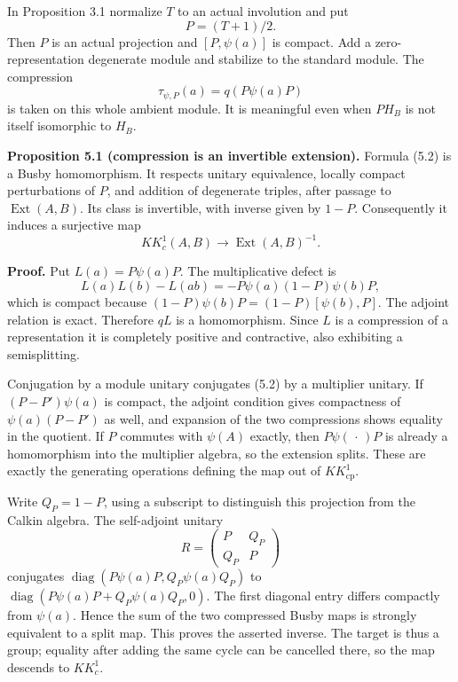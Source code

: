 \documentclass[
  11pt,
]{article}
\begin{document}
In Proposition 3.1 normalize \(T\) to an actual involution and put \[
P=(T+1)/2.
\tag{5.1}
\] Then \(P\) is an actual projection and \([P,\psi(a)]\) is compact.
Add a zero-representation degenerate module and stabilize to the
standard module. The compression \[
\tau_{\psi,P}(a)=q(P\psi(a)P)
\tag{5.2}
\] is taken on this whole ambient module. It is meaningful even when
\(PH_B\) is not itself isomorphic to \(H_B\).

\textbf{Proposition 5.1 (compression is an invertible extension).}
Formula (5.2) is a Busby homomorphism. It respects unitary equivalence,
locally compact perturbations of \(P\), and addition of degenerate
triples, after passage to \(\operatorname{Ext}(A,B)\). Its class is
invertible, with inverse given by \(1-P\). Consequently it induces a
surjective map \[
KK_c^1(A,B)\longrightarrow\operatorname{Ext}(A,B)^{-1}.
\tag{5.3}
\]

\textbf{Proof.} Put \(L(a)=P\psi(a)P\). The multiplicative defect is \[
L(a)L(b)-L(ab)
=-P\psi(a)(1-P)\psi(b)P,
\tag{5.4}
\] which is compact because \((1-P)\psi(b)P=(1-P)[\psi(b),P]\). The
adjoint relation is exact. Therefore \(qL\) is a homomorphism. Since
\(L\) is a compression of a representation it is completely positive and
contractive, also exhibiting a semisplitting.

Conjugation by a module unitary conjugates (5.2) by a multiplier
unitary. If \((P-P')\psi(a)\) is compact, the adjoint condition gives
compactness of \(\psi(a)(P-P')\) as well, and expansion of the two
compressions shows equality in the quotient. If \(P\) commutes with
\(\psi(A)\) exactly, then \(P\psi(\,\cdot\,)P\) is already a
homomorphism into the multiplier algebra, so the extension splits. These
are exactly the generating operations defining the map out of
\(KK_{\mathrm{cp}}^1\).

Write \(Q_P=1-P\), using a subscript to distinguish this projection from
the Calkin algebra. The self-adjoint unitary \[
R=\begin{pmatrix}P&Q_P\\Q_P&P\end{pmatrix}
\tag{5.5}
\] conjugates \(\operatorname{diag}(P\psi(a)P,Q_P\psi(a)Q_P)\) to
\(\operatorname{diag}(P\psi(a)P+Q_P\psi(a)Q_P,0)\). The first diagonal
entry differs compactly from \(\psi(a)\). Hence the sum of the two
compressed Busby maps is strongly equivalent to a split map. This proves
the asserted inverse. The target is thus a group; equality after adding
the same cycle can be cancelled there, so the map descends to
\(KK_c^1\).
\end{document}
